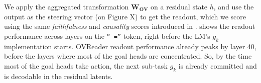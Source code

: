 We apply the aggregated transformation $\mathbf{W_{OV}}$ on a residual state $h$, and use the output as the steering vector (on {\color{red} Figure X}) to get the readout, which we score using the same \emph{faithfulness} and \emph{causality} scores introduced in .  shows the readout performance across layers on the \texttt{`` =''} token, right before the LM's $g_k$ implementation starts. OVReader readout performance already peaks by layer 40, before the layers where most of the goal heads are concentrated. So, by the time most of the goal heads take action, the next sub-task $g_k$ is already committed and is decodable in the residual latents. 





